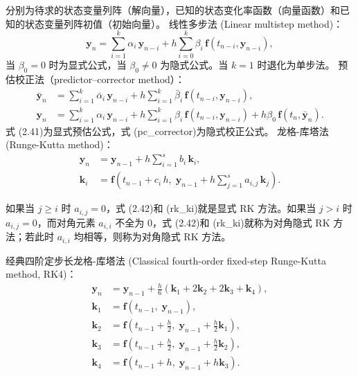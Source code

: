 分别为待求的状态变量列阵（解向量），已知的状态变化率函数（向量函数）和已知的状态变量列阵初值（初始向量）。
线性多步法 (Linear multistep method)：
\[
\boldsymbol{y}_n = \sum_{i=1}^{k}\alpha_i\,\boldsymbol{y}_{n-i} + h\sum_{i=0}^{k}\beta_i\,\boldsymbol{f}(t_{n-i},\boldsymbol{y}_{n-i}),
\]
当 $\beta_0 = 0$ 时为显式公式，当 $\beta_0 \neq 0$ 为隐式公式。当 $k = 1$ 时退化为单步法。
预估校正法（predictor–corrector method）：
\begin{align*}\bar{\boldsymbol{y}}_n &= \sum_{i=1}^{k}\bar{\alpha}_i\,\boldsymbol{y}_{n-i} + h\sum_{i=1}^{k}\bar{\beta}_i\,\boldsymbol{f}(t_{n-i},\boldsymbol{y}_{n-i}), \tag{I-a}\\[6pt]
    \boldsymbol{y}_n &= \sum_{i=1}^{k}\alpha_i\,\boldsymbol{y}_{n-i} + h\sum_{i=1}^{k}\beta_i\,\boldsymbol{f}(t_{n-i},\boldsymbol{y}_{n-i}) + h\beta_0\,\boldsymbol{f}(t_n,\bar{\boldsymbol{y}}_n). \tag{I-b}\end{align*}
式 (2.41)为显式预估公式，式 (pc\_corrector)为隐式校正公式。
龙格-库塔法 (Runge-Kutta method)：
\begin{align*}\boldsymbol{y}_n &= \boldsymbol{y}_{n-1} + h\sum_{i=1}^{s}b_i\,\boldsymbol{k}_i, \tag{II-a}\\[6pt]
    \boldsymbol{k}_i &= \boldsymbol{f}\!\left(t_{n-1}+c_i\,h,\;\boldsymbol{y}_{n-1}+h\sum_{j=1}^{s}a_{i,j}\,\boldsymbol{k}_j\right). \tag{II-b}\end{align*}
\begin{note}
如果当 $j \geq i$ 时 $a_{i,j} = 0$，式 (2.42)和 (rk\_ki)就是显式 RK 方法。如果当 $j > i$ 时 $a_{i,j} = 0$，而对角元素 $a_{i,i}$ 不全为 $0$，式 (2.42)和 (rk\_ki)就称为对角隐式 RK 方法；若此时 $a_{i,i}$ 均相等，则称为对角隐式 RK 方法。
\end{note}
经典四阶定步长龙格-库塔法 (Classical fourth-order fixed-step Runge-Kutta method, RK4)：
\begin{align*}\boldsymbol{y}_n &= \boldsymbol{y}_{n-1} + \frac{h}{6}(\boldsymbol{k}_1 + 2\boldsymbol{k}_2 + 2\boldsymbol{k}_3 + \boldsymbol{k}_4), \\
    \boldsymbol{k}_1 &= \boldsymbol{f}(t_{n-1},\;\boldsymbol{y}_{n-1}), \\
    \boldsymbol{k}_2 &= \boldsymbol{f}\!\left(t_{n-1}+\frac{h}{2},\;\boldsymbol{y}_{n-1}+\frac{h}{2}\boldsymbol{k}_1\right), \\
    \boldsymbol{k}_3 &= \boldsymbol{f}\!\left(t_{n-1}+\frac{h}{2},\;\boldsymbol{y}_{n-1}+\frac{h}{2}\boldsymbol{k}_2\right), \\
    \boldsymbol{k}_4 &= \boldsymbol{f}\!\left(t_{n-1}+h,\;\boldsymbol{y}_{n-1}+h\boldsymbol{k}_3\right). \end{align*}
